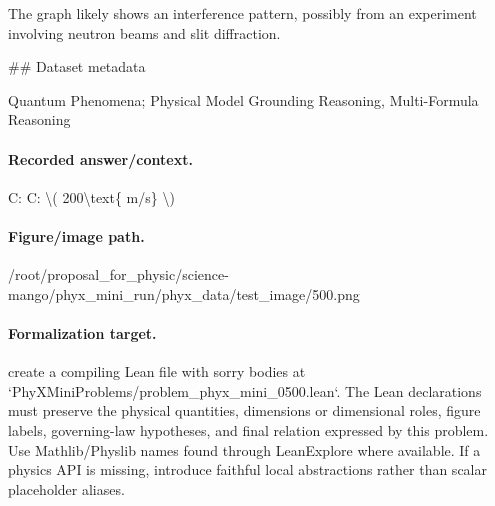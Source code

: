 The graph likely shows an interference pattern, possibly from an experiment involving neutron beams and slit diffraction.

\#\# Dataset metadata

Quantum Phenomena; Physical Model Grounding Reasoning, Multi-Formula Reasoning

\paragraph{Recorded answer/context.}
C: C: \textbackslash{}( 200\textbackslash{}text\{ m/s\} \textbackslash{})

\paragraph{Figure/image path.}
/root/proposal\_for\_physic/science-mango/phyx\_mini\_run/phyx\_data/test\_image/500.png

\paragraph{Formalization target.}
create a compiling Lean file with sorry bodies at `PhyXMiniProblems/problem\_phyx\_mini\_0500.lean`. The Lean declarations must preserve the physical quantities, dimensions or dimensional roles, figure labels, governing-law hypotheses, and final relation expressed by this problem.
Use Mathlib/Physlib names found through LeanExplore where available. If a physics API is missing, introduce faithful local abstractions rather than scalar placeholder aliases.

